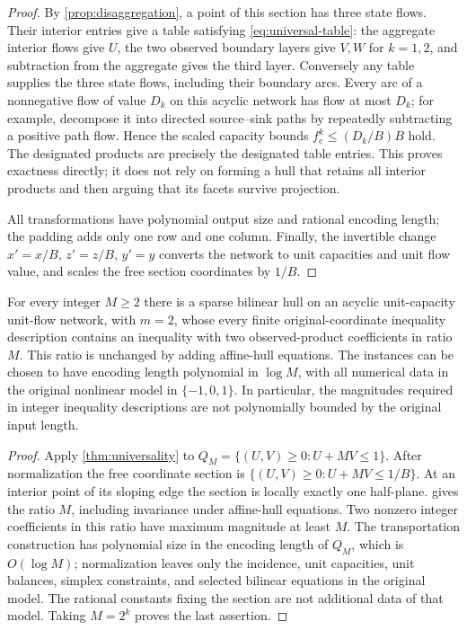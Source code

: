 \begin{proof}
By \cref{prop:disaggregation}, a point of this section has three state
flows. Their interior entries give a table satisfying
\eqref{eq:universal-table}: the aggregate interior flows give $U$,
the two observed boundary layers give $V,W$ for $k=1,2$, and
subtraction from the aggregate gives the third layer. Conversely any
table supplies the three state flows, including their boundary arcs.
Every arc of a nonnegative flow of value $D_k$ on this acyclic network
has flow at most $D_k$; for example, decompose it into directed
source--sink paths by repeatedly subtracting a positive path flow.
Hence the scaled capacity bounds $f^k_e\le(D_k/B)B$ hold.
The designated products are precisely the designated table entries.
This proves exactness directly; it does not rely on forming a hull that
retains all interior products and then arguing that its facets survive
projection.

All transformations have polynomial output size and rational encoding
length; the padding adds only one row and one column. Finally, the
invertible change $x'=x/B$, $z'=z/B$, $y'=y$ converts the network
to unit capacities and unit flow value, and scales the free section
coordinates by $1/B$.
\end{proof}

\begin{corollary}\label{cor:universal-coefficients}
For every integer $M\ge2$ there is a sparse bilinear hull on an acyclic
unit-capacity unit-flow network, with $m=2$, whose every finite
original-coordinate inequality description contains an inequality with
two observed-product coefficients in ratio $M$. This ratio is unchanged
by adding affine-hull equations. The instances can be chosen to have
encoding length polynomial in $\log M$, with all numerical data in the
original nonlinear model in $\{-1,0,1\}$. In particular, the magnitudes
required in integer inequality descriptions are not polynomially bounded
by the original input length.
\end{corollary}
\begin{proof}
Apply \cref{thm:universality} to
$Q_M=\{(U,V)\ge0:U+MV\le1\}$. After normalization the free
coordinate section is $\{(U,V)\ge0:U+MV\le1/B\}$.
At an interior point of its sloping edge the section is locally exactly
one half-plane.  gives the ratio $M$, including
invariance under affine-hull equations. Two nonzero integer coefficients
in this ratio have maximum magnitude at least $M$.
The transportation construction has polynomial size in the encoding
length of $Q_M$, which is $O(\log M)$; normalization leaves only the
incidence, unit capacities, unit balances, simplex constraints, and
selected bilinear equations in the original model. The rational constants
fixing the section are not additional data of that model.
Taking $M=2^k$ proves the last assertion.
\end{proof}

